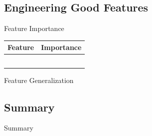 \subsection{Engineering Good Features}

\begin{frame}{Feature Importance}
  \footnotesize
  \renewcommand{\arraystretch}{1.25}
  \begin{tabular}{@{}ll@{}}
    \toprule
    \textbf{Feature} & \textbf{Importance}\\
    \midrule
     & \\
     & \\
     & \\
     & \\
     & \\
    \bottomrule
  \end{tabular}
\end{frame}

\begin{frame}{Feature Generalization}
  \begin{withmargin}
    \begin{tdmain}
    \end{tdmain}
    \begin{tdmargin}
    \end{tdmargin}
  \end{withmargin}
\end{frame}

\subsection{Summary}

\begin{frame}{Summary}
  \begin{takeaway}
  \end{takeaway}
\end{frame}

\chapterreferences

